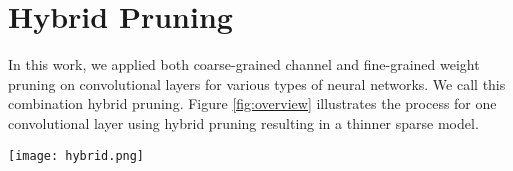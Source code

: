 \documentclass{article}
\begin{document}
\section{Hybrid Pruning}
\label{sec:hybrid}
In this work, we applied both coarse-grained channel and fine-grained weight pruning on convolutional layers for various types of neural networks. We call this combination hybrid pruning. Figure \ref{fig:overview} illustrates the process for one convolutional layer using hybrid pruning resulting in a thinner sparse model.

\begin{figure*}[!htbp]
\vspace{-2mm}
\begin{center}
\texttt{[image: hybrid.png]}
\end{center}
\caption{Pictorial view of our proposed hybrid pruning}
\label{fig:overview}
\vspace{-2mm}
\end{figure*} 
\end{document}
